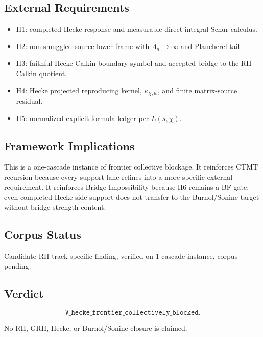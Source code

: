 \subsection*{External Requirements}

\begin{itemize}
  \item H1: completed Hecke response and measurable direct-integral Schur calculus.
  \item H2: non-smuggled source lower-frame with \(\Lambda_n\to\infty\) and Plancherel tail.
  \item H3: faithful Hecke Calkin boundary symbol and accepted bridge to the RH Calkin quotient.
  \item H4: Hecke projected reproducing kernel, \(\kappa_{\chi,w}\), and finite matrix-source residual.
  \item H5: normalized explicit-formula ledger per \(L(s,\chi)\).
\end{itemize}

\subsection*{Framework Implications}

This is a one-cascade instance of frontier collective blockage. It reinforces
CTMT recursion because every support lane refines into a more specific external
requirement. It reinforces Bridge Impossibility because H6 remains a BF gate:
even completed Hecke-side support does not transfer to the Burnol/Sonine target
without bridge-strength content.

\subsection*{Corpus Status}

Candidate RH-track-specific finding, verified-on-1-cascade-instance,
corpus-pending.

\subsection*{Verdict}

\[
\texttt{V\_hecke\_frontier\_collectively\_blocked}.
\]

No RH, GRH, Hecke, or Burnol/Sonine closure is claimed.
